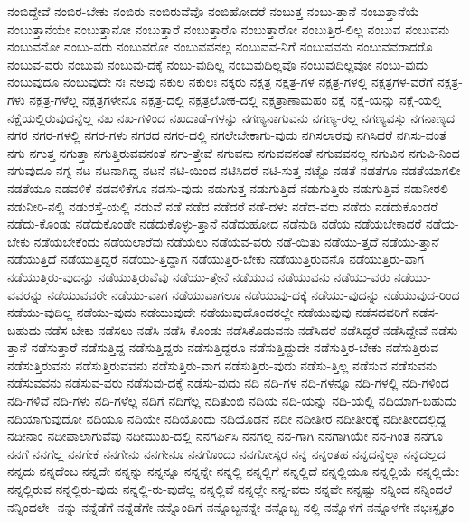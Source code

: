 {ನಂಬಿದ್ದೇವೆ
ನಂಬಿರ-ಬೇಕು
ನಂಬಿರು
ನಂಬಿರುವೆವೊ
ನಂಬಿಹೋದರೆ
ನಂಬುತ್ತ
ನಂಬು-ತ್ತಾನೆ
ನಂಬುತ್ತಾನೆಯೆ
ನಂಬುತ್ತಾನೆಯೇ
ನಂಬುತ್ತಾನೋ
ನಂಬುತ್ತಾರೆ
ನಂಬುತ್ತಾರೊ
ನಂಬುತ್ತಾರೋ
ನಂಬುತ್ತಿರ-ಲಿಲ್ಲ
ನಂಬುವ
ನಂಬುವನು
ನಂಬುವನೋ
ನಂಬು-ವರು
ನಂಬುವರೋ
ನಂಬುವವನಲ್ಲ
ನಂಬುವವ-ನಿಗೆ
ನಂಬುವವನು
ನಂಬುವವರಾದರೊ
ನಂಬುವ-ವರು
ನಂಬುವು
ನಂಬುವು-ದಕ್ಕೆ
ನಂಬು-ವುದಿಲ್ಲ
ನಂಬುವುದಿಲ್ಲವೊ
ನಂಬುವುದಿಲ್ಲವೋ
ನಂಬು-ವುದು
ನಂಬುವುದೂ
ನಂಬುವುದೇ
ನಃ
ನಅವು
ನಕುಲ
ನಕುಲಃ
ನಕ್ಕರು
ನಕ್ಷತ್ರ
ನಕ್ಷತ್ರ-ಗಳ
ನಕ್ಷತ್ರ-ಗಳಲ್ಲಿ
ನಕ್ಷತ್ರಗಳ-ವರೆಗೆ
ನಕ್ಷತ್ರ-ಗಳು
ನಕ್ಷತ್ರ-ಗಳೆಲ್ಲ
ನಕ್ಷತ್ರಗಳೇನೊ
ನಕ್ಷತ್ರ-ದಲ್ಲಿ
ನಕ್ಷತ್ರಲೋಕ-ದಲ್ಲಿ
ನಕ್ಷತ್ರಾಣಾಮಹಂ
ನಕ್ಷೆ
ನಕ್ಷೆ-ಯನ್ನು
ನಕ್ಷೆ-ಯಲ್ಲಿ
ನಕ್ಷೆಯಲ್ಲಿರುವುದನ್ನೆಲ್ಲ
ನಖ
ನಖ-ಗಳಿಂದ
ನಖದಾಡೆ-ಗಳನ್ನು
ನಗಣ್ಯನಾಗುವನು
ನಗಣ್ಯ-ರಲ್ಲ
ನಗಣ್ಯವಸ್ತು
ನಗನಾಣ್ಯದ
ನಗರ
ನಗರ-ಗಳಲ್ಲಿ
ನಗರ-ಗಳು
ನಗರದ
ನಗರ-ದಲ್ಲಿ
ನಗಲೇಬೇಕಾಗು-ವುದು
ನಗಿಸಲಾರವು
ನಗಿಸಿದರೆ
ನಗಿಸು-ವಂತೆ
ನಗು
ನಗುತ್ತ
ನಗುತ್ತಾ
ನಗುತ್ತಿರುವವನಂತೆ
ನಗು-ತ್ತೇವೆ
ನಗುವನು
ನಗುವವನಂತೆ
ನಗುವವನಲ್ಲ
ನಗುವಿನ
ನಗುವಿ-ನಿಂದ
ನಗುವುದೂ
ನಗ್ನ
ನಟ
ನಟನಾಗಿದ್ದ
ನಟನೆ
ನಟಿ-ಯಿಂದ
ನಟಿಸಿದರೆ
ನಟಿ-ಸುತ್ತ
ನಟ್ಟೊ
ನಡತೆ
ನಡತೆಗೂ
ನಡತೆಯಾಗಲೀ
ನಡತೆಯೂ
ನಡವಳಿಕೆ
ನಡವಳಿಕೆಗೂ
ನಡಸು-ವುದು
ನಡುಗುತ್ತ
ನಡುಗುತ್ತಿದೆ
ನಡುಗುತ್ತಿರು
ನಡುಗುತ್ತಿವೆ
ನಡುನೀರಲಿ
ನಡುನೀರಿ-ನಲ್ಲಿ
ನಡುರಸ್ತೆ-ಯಲ್ಲಿ
ನಡುವೆ
ನಡೆ
ನಡೆದ
ನಡೆದರೆ
ನಡೆ-ದಳು
ನಡೆದ-ವರು
ನಡೆದು
ನಡೆದುಕೊಂಡರೆ
ನಡೆದು-ಕೊಂಡು
ನಡೆದುಕೊಂಡೇ
ನಡೆದುಕೊಳ್ಳು-ತ್ತಾನೆ
ನಡೆದುಹೋದ
ನಡೆನುಡಿ
ನಡೆಯ
ನಡೆಯಬೇಕಾದರೆ
ನಡೆಯ-ಬೇಕು
ನಡೆಯಬೇಕೆಂದು
ನಡೆಯಲಾರೆವು
ನಡೆಯಲು
ನಡೆಯವ-ವರು
ನಡೆ-ಯಿತು
ನಡೆಯು-ತ್ತದೆ
ನಡೆಯು-ತ್ತಾನೆ
ನಡೆಯುತ್ತಿದೆ
ನಡೆಯುತ್ತಿದ್ದರೆ
ನಡೆಯು-ತ್ತಿದ್ದಾಗ
ನಡೆಯುತ್ತಿರ-ಬೇಕು
ನಡೆಯುತ್ತಿರುವನೊ
ನಡೆಯುತ್ತಿರು-ವಾಗ
ನಡೆಯುತ್ತಿರು-ವುದನ್ನು
ನಡೆಯುತ್ತಿರುವೆವು
ನಡೆಯು-ತ್ತೇನೆ
ನಡೆಯುವ
ನಡೆಯುವನು
ನಡೆಯು-ವರು
ನಡೆಯು-ವವರನ್ನು
ನಡೆಯುವವರೇ
ನಡೆಯು-ವಾಗ
ನಡೆಯುವಾಗಲೂ
ನಡೆಯುವು-ದಕ್ಕೆ
ನಡೆಯು-ವುದನ್ನು
ನಡೆಯುವುದ-ರಿಂದ
ನಡೆಯು-ವುದಿಲ್ಲ
ನಡೆಯು-ವುದು
ನಡೆಯುವುದೇ
ನಡೆಯುವುದೊಂದರಲ್ಲೇ
ನಡೆಯುವುವು
ನಡೆಸದವರಿಗೆ
ನಡೆಸ-ಬಹುದು
ನಡೆಸ-ಬೇಕು
ನಡೆಸಲು
ನಡೆಸಿ
ನಡೆಸಿ-ಕೊಂಡು
ನಡೆಸಿಕೊಡುವನು
ನಡೆಸಿದರೆ
ನಡೆಸಿದ್ದರೆ
ನಡೆಸಿದ್ದೇವೆ
ನಡೆಸು-ತ್ತಾನೆ
ನಡೆಸುತ್ತಾರೆ
ನಡೆಸುತ್ತಿದ್ದ
ನಡೆಸುತ್ತಿದ್ದರು
ನಡೆಸುತ್ತಿದ್ದರೂ
ನಡೆಸುತ್ತಿದ್ದುದೇ
ನಡೆಸುತ್ತಿರ-ಬೇಕು
ನಡೆಸುತ್ತಿರುವ
ನಡೆಸುತ್ತಿರುವನು
ನಡೆಸುತ್ತಿರುವವನು
ನಡೆಸುತ್ತಿರು-ವಾಗ
ನಡೆಸುತ್ತಿರು-ವುದು
ನಡೆಸು-ತ್ತಿಲ್ಲ
ನಡೆಸುವ
ನಡೆಸುವನು
ನಡೆಸುವವನು
ನಡೆಸುವ-ವರು
ನಡೆಸುವು-ದಕ್ಕೆ
ನಡೆಸು-ವುದು
ನದಿ
ನದಿ-ಗಳ
ನದಿ-ಗಳನ್ನೂ
ನದಿ-ಗಳಲ್ಲಿ
ನದಿ-ಗಳಿಂದ
ನದಿ-ಗಳಿವೆ
ನದಿ-ಗಳು
ನದಿ-ಗಳೆಲ್ಲ
ನದಿಗೆ
ನದಿಗೆಲ್ಲ
ನದಿತುಂಬಿ
ನದಿಯ
ನದಿ-ಯನ್ನು
ನದಿ-ಯಲ್ಲಿ
ನದಿಯಾಗ-ಬಹುದು
ನದಿಯಾಗುವುದೋ
ನದಿಯೂ
ನದಿಯೇ
ನದಿಯೊಂದು
ನದಿಯೊಡನೆ
ನದೀ
ನದೀತೀರ
ನದೀತೀರಕ್ಕೆ
ನದೀತೀರದಲ್ಲಿದ್ದ
ನದೀನಾಂ
ನದೀಪಾಲಾಗುವೆವು
ನದೀಮುಖ-ದಲ್ಲಿ
ನನಗರ್ಪಿಸಿ
ನನಗಲ್ಲ
ನನ-ಗಾಗಿ
ನನಗಾಗಿಯೇ
ನನ-ಗಿಂತ
ನನಗೂ
ನನಗೆ
ನನಗೆಲ್ಲ
ನನಗೇಕೆ
ನನಗೇನು
ನನಗೇನೂ
ನನಗೊಂದು
ನನಗೋಸ್ಕರ
ನನ್ನ
ನನ್ನಂತಹ
ನನ್ನದನ್ನೆಲ್ಲಾ
ನನ್ನದಲ್ಲದ
ನನ್ನದು
ನನ್ನದೆಂಬ
ನನ್ನದೇ
ನನ್ನನ್ನು
ನನ್ನನ್ನೂ
ನನ್ನನ್ನೇ
ನನ್ನಲ್ಲಿ
ನನ್ನಲ್ಲಿಗೆ
ನನ್ನಲ್ಲಿದೆ
ನನ್ನಲ್ಲಿಯೂ
ನನ್ನಲ್ಲಿಯೆ
ನನ್ನಲ್ಲಿಯೇ
ನನ್ನಲ್ಲಿರುವ
ನನ್ನಲ್ಲಿರು-ವುದು
ನನ್ನಲ್ಲಿ-ರು-ವುದೆಲ್ಲ
ನನ್ನಲ್ಲಿವೆ
ನನ್ನಲ್ಲೇ
ನನ್ನ-ವರು
ನನ್ನವೇ
ನನ್ನಷ್ಟು
ನನ್ನಿಂದ
ನನ್ನಿಂದಲೆ
ನನ್ನಿಂದಲೇ
-ನನ್ನು
ನನ್ನೆಡೆಗೆ
ನನ್ನೆಡೆಗೇ
ನನ್ನೊಂದಿಗೆ
ನನ್ನೊಬ್ಬನನ್ನೇ
ನನ್ನೊಬ್ಬ-ನಲ್ಲಿ
ನನ್ನೊಳಗೆ
ನನ್ನೊಳಗೇ
ನಭಃಸ್ಪೃಶಂ
}
